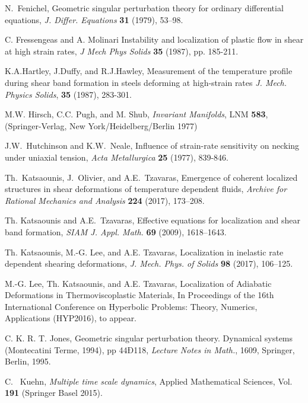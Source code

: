 \documentclass[usletter,11pt]{article}
\theoremstyle{remark}
\begin{document}
\begin{thebibliography}{10}
{\sc N.~Fenichel},
Geometric singular perturbation theory for ordinary differential equations,
{\it J. Differ. Equations} {\bf 31} (1979), 53--98.

{\sc C. Fressengeas and A. Molinari }
{ Instability and localization of plastic flow in shear at high strain rates}, {\it J Mech Phys Solids} {\bf 35} (1987), pp. 185-211.


{\sc K.A.Hartley, J.Duffy, and R.J.Hawley},
{ Measurement of the temperature profile during shear band formation in steels deforming at high-strain rates}
{\it  J. Mech. Physics Solids}, {\bf 35} (1987), 283-301.
 
{\sc M.W. Hirsch, C.C. Pugh, and M. Shub},
{\it Invariant Manifolds}, LNM {\bf 583}, (Springer-Verlag, New York/Heidelberg/Berlin 1977)

{\sc J.W.~Hutchinson and K.W.~Neale},
Influence of strain-rate sensitivity on necking under uniaxial tension,
{\it  Acta Metallurgica} {\bf 25} (1977), 839-846.

{\sc Th.~Katsaounis, J.~Olivier, and A.E.~Tzavaras},
Emergence of coherent localized structures in shear deformations of temperature dependent fluids,
{\it Archive for Rational Mechanics and Analysis} {\bf 224} (2017), 173--208.

{\sc Th. Katsaounis and A.E.~Tzavaras},
Effective equations for localization and shear band formation,
{\it SIAM J. Appl. Math.}  {\bf 69} (2009), 1618--1643.

{\sc Th. Katsaounis, M.-G. Lee, and A.E. Tzavaras},
Localization in inelastic rate dependent shearing deformations,
{\it J. Mech. Phys. of Solids} {\bf 98} (2017), 106--125.

{\sc M.-G. Lee, Th. Katsaounis, and A.E. Tzavaras},
Localization of Adiabatic Deformations in Thermoviscoplastic Materials, In Proceedings of the 16th International Conference on Hyperbolic Problems: Theory, Numerics, Applications (HYP2016), to appear.

{\sc C. K. R. T.  Jones}, 
Geometric singular perturbation theory. 
Dynamical systems (Montecatini Terme, 1994), pp 44Ð118, {\it Lecture Notes in Math.}, 1609, Springer, Berlin, 1995.


{\sc C.~ Kuehn}, 
{\it Multiple time scale dynamics}, Applied Mathematical Sciences, Vol. {\bf 191} (Springer Basel 2015).


\end{thebibliography}
\end{document}
